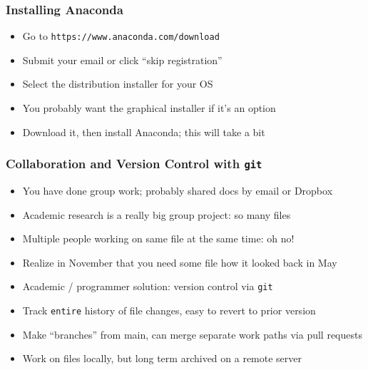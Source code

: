 \documentclass[aspectratio=169]{beamer}
\begin{document}
\begin{frame}
\frametitle{Installing Anaconda}
\begin{itemize}
	\item Go to \texttt{https://www.anaconda.com/download}
	
	\item Submit your email or click ``skip registration''
	
	\item Select the distribution installer for your OS
	
	\item You probably want the graphical installer if it's an option
	
	\item Download it, then install Anaconda; this will take a bit
\end{itemize}
\end{frame}


\begin{frame}
\frametitle{Collaboration and Version Control with \texttt{git}}
\begin{itemize}
	\item You have done group work; probably shared docs by email or Dropbox
	
	\item Academic research is a really big group project: so many files
	
	\item <2->Multiple people working on same file at the same time: oh no!
	
	\item <2->Realize in November that you need some file how it looked back in May
	
	\item <3->Academic / programmer solution: version control via \texttt{git}
	
	\item <3->Track \texttt{entire} history of file changes, easy to revert to prior version
	
	\item <4->Make ``branches'' from main, can merge separate work paths via pull requests
	
	\item <4->Work on files locally, but long term archived on a remote server
\end{itemize}
\end{frame}
\end{document}
